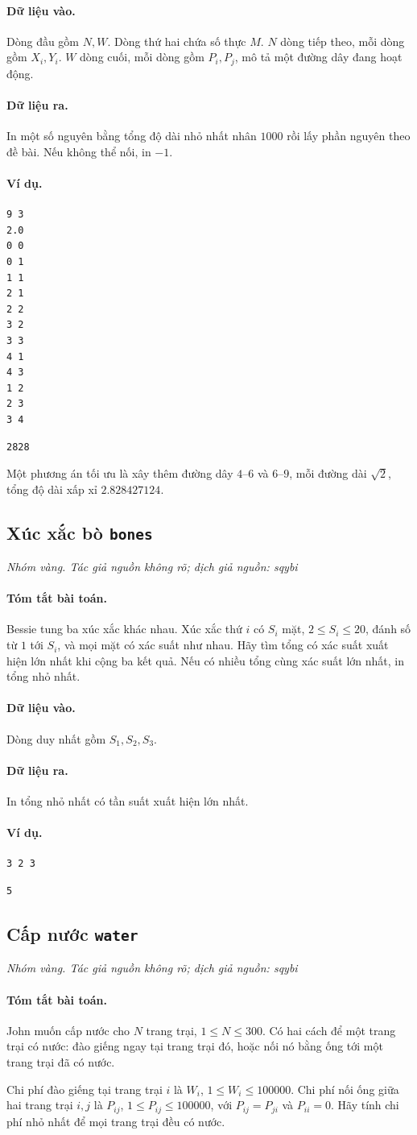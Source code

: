 \documentclass[11pt]{article}
\newcommand{\problem}[4]{%
  \subsection[#1 (#2)]{#1 \hfill {\normalsize\texttt{#2}}}%
  \noindent\textit{#3. #4}\par\smallskip
}
\newcommand{\iosec}[1]{\paragraph{#1}}
\begin{document}
\iosec{Dữ liệu vào.}
Dòng đầu gồm \(N,W\). Dòng thứ hai chứa số thực \(M\). \(N\) dòng tiếp theo,
mỗi dòng gồm \(X_i,Y_i\). \(W\) dòng cuối, mỗi dòng gồm \(P_i,P_j\), mô tả
một đường dây đang hoạt động.

\iosec{Dữ liệu ra.}
In một số nguyên bằng tổng độ dài nhỏ nhất nhân \(1000\) rồi lấy phần nguyên
theo đề bài. Nếu không thể nối, in \(-1\).

\iosec{Ví dụ.}
\begin{verbatim}
9 3
2.0
0 0
0 1
1 1
2 1
2 2
3 2
3 3
4 1
4 3
1 2
2 3
3 4
\end{verbatim}

\begin{verbatim}
2828
\end{verbatim}

Một phương án tối ưu là xây thêm đường dây \(4\)--\(6\) và \(6\)--\(9\), mỗi
đường dài \(\sqrt2\), tổng độ dài xấp xỉ \(2.828427124\).

\problem{Xúc xắc bò}{bones}{Nhóm vàng}{Tác giả nguồn không rõ; dịch giả nguồn: sqybi}

\iosec{Tóm tắt bài toán.}
Bessie tung ba xúc xắc khác nhau. Xúc xắc thứ \(i\) có \(S_i\) mặt,
\(2\le S_i\le 20\), đánh số từ \(1\) tới \(S_i\), và mọi mặt có xác suất như
nhau. Hãy tìm tổng có xác suất xuất hiện lớn nhất khi cộng ba kết quả. Nếu có
nhiều tổng cùng xác suất lớn nhất, in tổng nhỏ nhất.

\iosec{Dữ liệu vào.}
Dòng duy nhất gồm \(S_1,S_2,S_3\).

\iosec{Dữ liệu ra.}
In tổng nhỏ nhất có tần suất xuất hiện lớn nhất.

\iosec{Ví dụ.}
\begin{verbatim}
3 2 3
\end{verbatim}

\begin{verbatim}
5
\end{verbatim}

\problem{Cấp nước}{water}{Nhóm vàng}{Tác giả nguồn không rõ; dịch giả nguồn: sqybi}

\iosec{Tóm tắt bài toán.}
John muốn cấp nước cho \(N\) trang trại, \(1\le N\le 300\). Có hai cách để
một trang trại có nước: đào giếng ngay tại trang trại đó, hoặc nối nó bằng
ống tới một trang trại đã có nước.

Chi phí đào giếng tại trang trại \(i\) là \(W_i\),
\(1\le W_i\le 100000\). Chi phí nối ống giữa hai trang trại \(i,j\) là
\(P_{ij}\), \(1\le P_{ij}\le 100000\), với \(P_{ij}=P_{ji}\) và \(P_{ii}=0\).
Hãy tính chi phí nhỏ nhất để mọi trang trại đều có nước.
\end{document}
